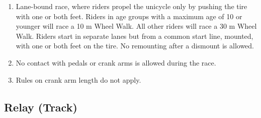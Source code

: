\begin{enumerate}[leftmargin=1.5em,labelsep=*]
	\item Lane-bound race, where riders propel the unicycle only by pushing the tire with one or both feet.
	Riders in age groups with a maximum age of 10 or younger will race a 10 m Wheel Walk.
	All other riders will race a 30 m Wheel Walk.
	Riders start in separate lanes but from a common start line, mounted, with one or both feet on the tire.
	No remounting after a dismount is allowed.
	
	\item No contact with pedals or crank arms is allowed during the race.
	
	\item Rules on crank arm length do not apply.
\end{enumerate}

\subsection{Relay (Track)\label{subsec:Relay_Track}}

